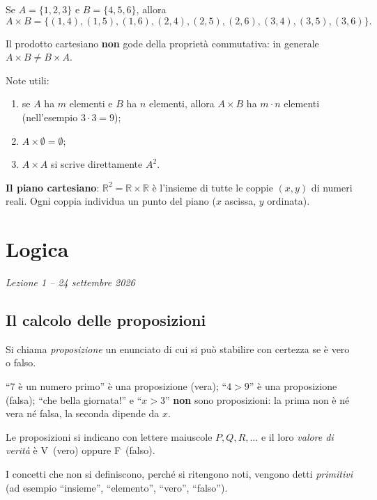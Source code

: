 \documentclass[11pt,a4paper]{article}
\newcommand{\V}{\textsf{V}}
\newcommand{\F}{\textsf{F}}
\begin{document}
\begin{esempio}
Se $A = \{1, 2, 3\}$ e $B = \{4, 5, 6\}$, allora
\[
A \times B = \{(1,4), (1,5), (1,6), (2,4), (2,5), (2,6), (3,4), (3,5), (3,6)\}.
\]
\end{esempio}

Il prodotto cartesiano \textbf{non} gode della proprietà commutativa:
in generale $A \times B \neq B \times A$.

Note utili:
\begin{enumerate}
    \item se $A$ ha $m$ elementi e $B$ ha $n$ elementi, allora
          $A \times B$ ha $m \cdot n$ elementi (nell'esempio $3 \cdot 3 = 9$);
    \item $A \times \emptyset = \emptyset$;
    \item $A \times A$ si scrive direttamente $A^2$.
\end{enumerate}

\textbf{Il piano cartesiano}: $\mathbb{R}^2 = \mathbb{R} \times \mathbb{R}$
è l'insieme di tutte le coppie $(x, y)$ di numeri reali. Ogni coppia
individua un punto del piano ($x$ ascissa, $y$ ordinata).

\section[Logica (Lezione 1 -- 24 settembre 2026)]{Logica}
\noindent\emph{Lezione 1 -- 24 settembre 2026}
\subsection{Il calcolo delle proposizioni}

\begin{definizione}
Si chiama \emph{proposizione} un enunciato di cui si può stabilire con
certezza se è vero o falso.
\end{definizione}

\begin{esempio}
``$7$ è un numero primo'' è una proposizione (vera);
``$4 > 9$'' è una proposizione (falsa);
``che bella giornata!'' e ``$x > 3$'' \textbf{non} sono proposizioni:
la prima non è né vera né falsa, la seconda dipende da $x$.
\end{esempio}

Le proposizioni si indicano con lettere maiuscole $P, Q, R, \dots$ e il loro
\emph{valore di verità} è \V\ (vero) oppure \F\ (falso).

I concetti che non si definiscono, perché si ritengono noti, vengono detti
\emph{primitivi} (ad esempio ``insieme'', ``elemento'', ``vero'', ``falso'').
\end{document}
